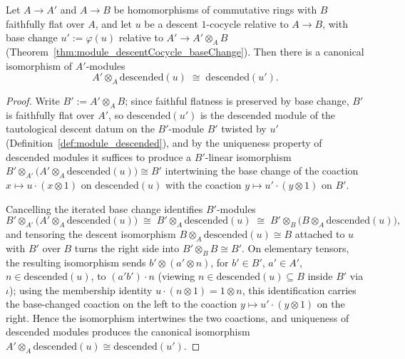 \begin{theorem}
  \label{thm:module_descendedBaseChangeEquiv}
  \leanok
  Let \(A \to A'\) and \(A \to B\) be homomorphisms of commutative rings with \(B\) faithfully
  flat over \(A\), and let \(u\) be a descent \(1\)-cocycle relative to \(A \to B\), with base
  change \(u' := \varphi(u)\) relative to \(A' \to A' \otimes_A B\)
  (Theorem~\ref{thm:module_descentCocycle_baseChange}). Then there is a canonical isomorphism of
  \(A'\)-modules
  \[
    A' \otimes_A \mathrm{descended}(u) \;\cong\; \mathrm{descended}(u').
  \]
\end{theorem}
\begin{proof}
  \leanok
  Write \(B' := A' \otimes_A B\); since faithful flatness is preserved by base change, \(B'\) is
  faithfully flat over \(A'\), so \(\mathrm{descended}(u')\) is the descended module of the
  tautological descent datum on the \(B'\)-module \(B'\) twisted by \(u'\)
  (Definition~\ref{def:module_descended}), and by the uniqueness property of descended modules
  it suffices to produce a \(B'\)-linear isomorphism
  \(B' \otimes_{A'} \bigl(A' \otimes_A \mathrm{descended}(u)\bigr) \cong B'\) intertwining the
  base change of the coaction \(x \mapsto u \cdot (x \otimes 1)\) on \(\mathrm{descended}(u)\)
  with the coaction \(y \mapsto u' \cdot (y \otimes 1)\) on \(B'\).

  Cancelling the iterated base change identifies \(B'\)-modules
  \[
    B' \otimes_{A'} \bigl(A' \otimes_A \mathrm{descended}(u)\bigr) \;\cong\; B' \otimes_A
    \mathrm{descended}(u) \;\cong\; B' \otimes_B \bigl(B \otimes_A \mathrm{descended}(u)\bigr),
  \]
  and tensoring the descent isomorphism \(B \otimes_A \mathrm{descended}(u) \cong B\) attached to
  \(u\) with \(B'\) over \(B\) turns the right side into \(B' \otimes_B B \cong B'\). On
  elementary tensors, the resulting isomorphism sends \(b' \otimes (a' \otimes n)\), for
  \(b' \in B'\), \(a' \in A'\), \(n \in \mathrm{descended}(u)\), to \((a' b') \cdot n\) (viewing
  \(n \in \mathrm{descended}(u) \subseteq B\) inside \(B'\) via \(\iota\)); using the membership
  identity \(u \cdot (n \otimes 1) = 1 \otimes n\), this identification carries the base-changed
  coaction on the left to the coaction \(y \mapsto u' \cdot (y \otimes 1)\) on the right. Hence
  the isomorphism intertwines the two coactions, and uniqueness of descended modules produces
  the canonical isomorphism \(A' \otimes_A \mathrm{descended}(u) \cong \mathrm{descended}(u')\).
\end{proof}

